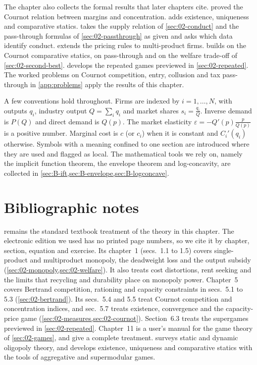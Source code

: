 The chapter also collects the formal results that later chapters cite.  proved the
Cournot relation between margins and concentration.  adds existence, uniqueness and
comparative statics.  takes the supply relation of
\cref{sec:02-conduct} and the pass-through formulas of \cref{sec:02-passthrough} as given and asks which data
identify conduct.  extends the pricing rules to multi-product firms.  builds on
the Cournot comparative statics, on pass-through and on the welfare trade-off of \cref{sec:02-second-best}.
 develops the repeated games previewed in \cref{sec:02-repeated}. The worked problems on
Cournot competition, entry, collusion and tax pass-through in \cref{app:problems} apply the results of this chapter.

A few conventions hold throughout. Firms are indexed by $i = 1, \dots, N$, with outputs $q_i$, industry output
$Q = \sum_i q_i$ and market shares $s_i = \frac{q_i}{Q}$. Inverse demand is $P(Q)$ and direct demand is $Q(p)$. The
market elasticity $\varepsilon = -Q'(p)\frac{p}{Q(p)}$ is a positive number. Marginal cost is $c$ (or $c_i$) when it
is constant and $C_i'(q_i)$ otherwise. Symbols with a meaning confined to one section are introduced where they are
used and flagged as local. The mathematical tools we rely on, namely the implicit function theorem, the envelope
theorem and log-concavity, are collected in \cref{sec:B-ift,sec:B-envelope,sec:B-logconcave}.






\section{Bibliographic notes}\label{sec:02-notes}

\citet{Tirole1988} remains the standard textbook treatment of the theory in this chapter. The electronic edition we
used has no printed page numbers, so we cite it by chapter, section, equation and exercise. Its chapter~1 (secs.~1.1
to 1.5) covers single-product and multiproduct monopoly, the deadweight loss and the output subsidy
(\cref{sec:02-monopoly,sec:02-welfare}). It also treats cost distortions, rent seeking and the limits that recycling
and durability place on monopoly power. Chapter~5 covers Bertrand competition, rationing and capacity constraints in
secs.~5.1 to 5.3 (\cref{sec:02-bertrand}). Its secs.~5.4 and 5.5 treat Cournot competition and concentration
indices, and sec.~5.7 treats existence, convergence and the capacity-price game
(\cref{sec:02-measures,sec:02-cournot}). Section~6.3 treats
the supergames previewed in \cref{sec:02-repeated}. Chapter~11 is a user's manual for the game theory of
\cref{sec:02-games}, and \citet{FudenbergTirole1991} give a complete treatment. \citet{Shapiro1989} surveys static
and dynamic oligopoly theory, and \citet{Vives1999} develops existence, uniqueness and comparative statics with the
tools of aggregative and supermodular games.


